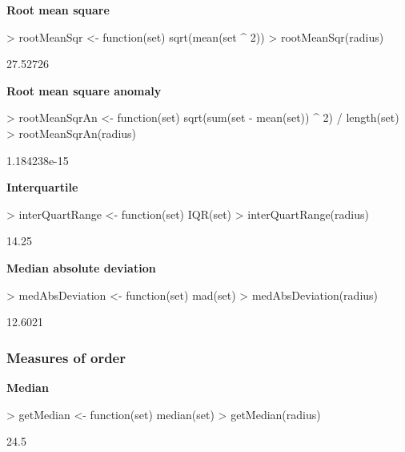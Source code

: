 \documentclass[a4paper]{article}
\begin{document}
\textbf{Root mean square}
\begin{Schunk}
\begin{Sinput}
> rootMeanSqr <- function(set) {sqrt(mean(set ^ 2))}
> rootMeanSqr(radius)
\end{Sinput}
\begin{Soutput}
[1] 27.52726
\end{Soutput}
\end{Schunk}

\textbf{Root mean square anomaly}
\begin{Schunk}
\begin{Sinput}
> rootMeanSqrAn <- function(set) {sqrt(sum(set - mean(set)) ^ 2) / length(set)}
> rootMeanSqrAn(radius)
\end{Sinput}
\begin{Soutput}
[1] 1.184238e-15
\end{Soutput}
\end{Schunk}

\textbf{Interquartile}
\begin{Schunk}
\begin{Sinput}
> interQuartRange <- function(set) {IQR(set)}
> interQuartRange(radius)
\end{Sinput}
\begin{Soutput}
[1] 14.25
\end{Soutput}
\end{Schunk}

\textbf{Median absolute deviation}
\begin{Schunk}
\begin{Sinput}
> medAbsDeviation <- function(set) {mad(set)}
> medAbsDeviation(radius)
\end{Sinput}
\begin{Soutput}
[1] 12.6021
\end{Soutput}
\end{Schunk}


\subsubsection*{Measures of order}

\textbf{Median}
\begin{Schunk}
\begin{Sinput}
> getMedian <- function(set) {median(set)}
> getMedian(radius)
\end{Sinput}
\begin{Soutput}
[1] 24.5
\end{Soutput}
\end{Schunk}
\end{document}
